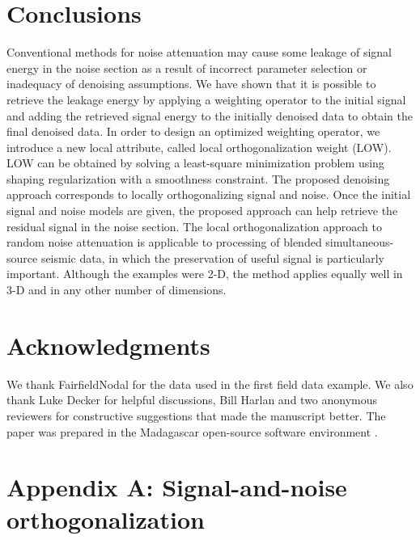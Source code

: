 
\section{Conclusions}
Conventional methods for noise attenuation may cause some leakage of signal energy in the noise section as a result of incorrect parameter selection or inadequacy of denoising assumptions. %
We have shown that it is possible to retrieve the leakage energy by applying a weighting operator to the initial signal and adding the retrieved signal energy to the initially denoised data to obtain the final denoised data. In order to design an optimized weighting operator, we introduce a new local attribute, called local orthogonalization weight (LOW). LOW can be obtained by solving a least-square minimization problem using shaping regularization with a smoothness constraint. The proposed denoising approach corresponds to locally orthogonalizing signal and noise. Once the initial signal and noise models are given, the proposed approach can help retrieve the residual signal in the noise section. The local orthogonalization approach to random noise attenuation is applicable to processing of blended simultaneous-source seismic data, in which the preservation of useful signal is particularly important. Although the examples were 2-D, the method applies equally well in 3-D and in any other number of dimensions.

\section{Acknowledgments}
We thank FairfieldNodal for the data used in the first field data example. We also thank Luke Decker for helpful discussions, Bill Harlan and two anonymous reviewers for constructive suggestions that made the manuscript better. The paper was prepared in the Madagascar open-source software environment \cite[]{mada2013}. 

\appendix
\section{Appendix A: Signal-and-noise orthogonalization}

